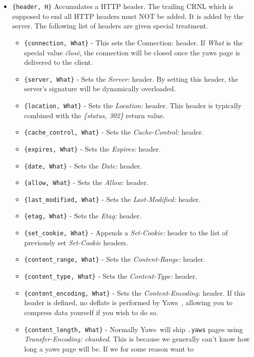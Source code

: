 \documentclass[11pt,oneside,english]{book}
\newcommand{\Yaws}            %
        {{\sc Yaws}}
\begin{document}
\begin{itemize}
\item \verb+{header, H}+ Accumulates a HTTP header. The trailing CRNL which is
  supposed to end all HTTP headers must NOT be added. It is added by the server.
  The following list of headers are given special treatment.

  \begin{itemize}
    \item \verb+{connection, What}+ - This sets the Connection: header. If
      \textit{What} is the special value \textit{\"close\"}, the connection will
      be closed once the yaws page is delivered to the client.
    \item \verb+{server, What}+ - Sets the \textit{Server:} header. By setting
      this header, the server's signature will be dynamically overloaded.
    \item \verb+{location, What}+ - Sets the \textit{Location:} header. This
      header is typically combined with the \textit{\{status, 302\}} return
      value.
    \item \verb+{cache_control, What}+ - Sets the \textit{Cache-Control:}
      header.
    \item \verb+{expires, What}+ - Sets the \textit{Expires:} header.
    \item \verb+{date, What}+ - Sets the \textit{Date:} header.
    \item \verb+{allow, What}+ - Sets the \textit{Allow:} header.
    \item \verb+{last_modified, What}+ - Sets the \textit{Last-Modified:}
      header.
    \item \verb+{etag, What}+ - Sets the \textit{Etag:} header.
    \item \verb+{set_cookie, What}+ - Appends a \textit{Set-Cookie:} header to
      the list of previously set \textit{Set-Cookie} headers.
    \item \verb+{content_range, What}+ - Sets the \textit{Content-Range:}
      header.
    \item \verb+{content_type, What}+ - Sets the \textit{Content-Type:} header.
    \item \verb+{content_encoding, What}+ - Sets the \textit{Content-Encoding:}
      header. If this header is defined, no deflate is performed by \Yaws\ ,
      allowing you to compress data yourself if you wish to do so.
    \item \verb+{content_length, What}+ - Normally \Yaws\ will ship \verb+.yaws+ pages
      using \textit{Transfer-Encoding: chunked}. This is because we generally
      can't know how long a yaws page will be. If we for some reason want to

\end{itemize}
\end{itemize}
\end{document}
